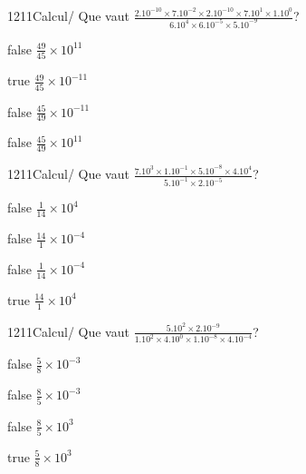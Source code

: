 \documentclass[11pt]{article}
\begin{document}
            \begin{question}{1211}{Calcul}{}{/}
                Que vaut $\frac{2.10^{-10}\times 7.10^{-2}\times 2.10^{-10}\times 7.10^{1}\times 1.10^{0}}{6.10^{4}\times 6.10^{-5}\times 5.10^{-9}}$?
            \end{question}
            
            \begin{reponses}
                \item[false] $\frac{49}{45}\times 10^{11}$
                \item[true] $\frac{49}{45}\times 10^{-11}$
                \item[false] $\frac{45}{49}\times 10^{-11}$
                \item[false] $\frac{45}{49}\times 10^{11}$
            \end{reponses}
            
            \begin{question}{1211}{Calcul}{}{/}
                Que vaut $\frac{7.10^{3}\times 1.10^{-1}\times 5.10^{-8}\times 4.10^{4}}{5.10^{-1}\times 2.10^{-5}}$?
            \end{question}
            
            \begin{reponses}
                \item[false] $\frac{1}{14}\times 10^{4}$
                \item[false] $\frac{14}{1}\times 10^{-4}$
                \item[false] $\frac{1}{14}\times 10^{-4}$
                \item[true] $\frac{14}{1}\times 10^{4}$
            \end{reponses}
            
            \begin{question}{1211}{Calcul}{}{/}
                Que vaut $\frac{5.10^{2}\times 2.10^{-9}}{1.10^{2}\times 4.10^{0}\times 1.10^{-8}\times 4.10^{-4}}$?
            \end{question}
            
            \begin{reponses}
                \item[false] $\frac{5}{8}\times 10^{-3}$
                \item[false] $\frac{8}{5}\times 10^{-3}$
                \item[false] $\frac{8}{5}\times 10^{3}$
                \item[true] $\frac{5}{8}\times 10^{3}$
            \end{reponses}
            
\end{document}
